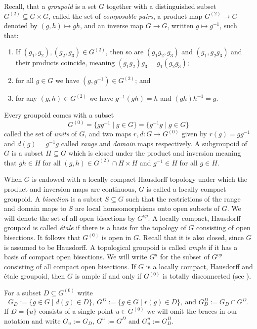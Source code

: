 	Recall, that a \textit{groupoid} is a set $G$ together with a distinguished subset $G^{(2)}\subseteq G\times G$, called the set of \textit{composable pairs}, a product map $G^{(2)}\rightarrow G$ denoted by $(g,h)\mapsto gh$, and an inverse map $G\rightarrow G$, written $g\mapsto g^{-1}$, such that:
	\begin{enumerate}
		\item If $(g_1,g_2),(g_2,g_3)\in G^{(2)}$, then so are $(g_1g_2,g_3)$ and $(g_1,g_2g_3)$ and their products coincide, meaning $(g_1g_2)g_3=g_1(g_2g_3)$;
		\item for all $g\in G$ we have $(g,g^{-1})\in G^{(2)}$; and
		\item for any $(g,h)\in G^{(2)}$ we have $g^{-1}(gh)=h$ and $(gh)h^{-1}=g$.
	\end{enumerate}
	Every groupoid comes with a subset
	$$G^{(0)}=\lbrace gg^{-1}\mid g\in G\rbrace=\lbrace g^{-1}g\mid g\in G\rbrace$$
	called the set of \textit{units} of $G$, and two maps $r,d:G\rightarrow G^{(0)}$ given by
	$r(g)=gg^{-1}$ and $d(g)=g^{-1}g$ called \textit{range} and \textit{domain} maps respectively.
	A subgroupoid of $G$ is a subset $H\subseteq G$ which is closed under the product and inversion meaning that $gh\in H$ for all $(g,h)\in G^{(2)}\cap H\times H$ and $g^{-1}\in H$ for all $g\in H$.
	
	When $G$ is endowed with a locally compact Hausdorff topology under which the product and inversion maps are continuous, $G$ is called a locally compact groupoid. A \textit{bisection} is a subset $S\subseteq G$ such that the restrictions of the range and domain maps to $S$ are local homeomorphisms onto open subsets of $G$. We will denote the set of all open bisections by $G^{op}$. A locally compact, Hausdorff groupoid is called \textit{étale} if there is a basis for the topology of $G$ consisting of open bisections. It follows that $G^{(0)}$ is open in $G$. Recall that it is also closed, since $G$ is assumed to be Hausdorff. A topological groupoid is called \emph{ample} if it has a basis of compact open bisections. We will write $G^a$ for the subset of $G^{op}$ consisting of all compact open bisections. If $G$ is a locally compact, Hausdorff and étale groupoid, then $G$ is ample if and only if $G^{(0)}$ is totally disconnected (see \cite[Proposition 4.1]{Exel10}).
	
	For a subset $D\subseteq G^{(0)}$ write
	$$G_D:=\lbrace g\in G\mid d(g)\in D\rbrace,\ G^D:=\lbrace g\in G\mid r(g)\in D\rbrace,\ \text{and } G_D^D:=G_D\cap G^D.$$
	If $D=\lbrace u\rbrace$ consists of a single point $u\in G^{(0)}$ we will omit the braces in our notation and write $G_u:=G_D$, $G^u:=G^D$ and $G_u^u:=G_D^D$.
	
